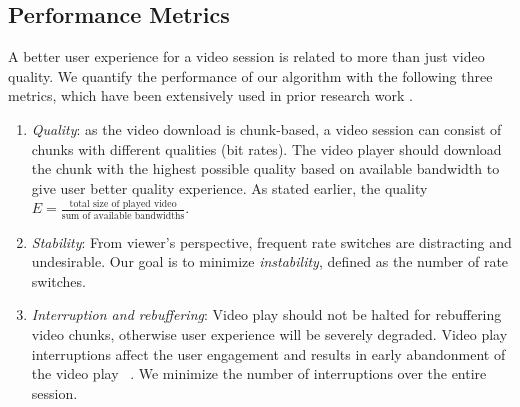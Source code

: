 \subsection{Performance Metrics}\label{subsec:metrics}

A better user experience for a video session is related to more than just video quality. 
We quantify the performance of our algorithm with the following three
metrics, which have been extensively used in prior research work
\cite{Qava, Avis,VideoMeasurement, Festive}. 


\begin{enumerate}
\item\textit{Quality}: as the video download is chunk-based, a video
  session can consist of chunks with different qualities (bit
  rates). The video player should download the chunk with the highest
  possible quality based on available bandwidth
  to give user better quality experience. As stated earlier, the quality
  $E = \frac{\mbox{total size of played video}}{\mbox{sum of available bandwidths}}$.

\item\textit{Stability}: From viewer's perspective, frequent rate
  switches are distracting and undesirable. Our goal is to minimize 
  \emph{instability}, defined as the number of rate switches.
  
\item\textit{Interruption and rebuffering}: Video play should not be
  halted for rebuffering video chunks, otherwise user experience will
  be severely degraded. Video play interruptions affect the user
  engagement and results in early abandonment of the video play
  ~\cite{VideoMeasurement}. We minimize the 
  number of interruptions over the entire session. %
\end{enumerate}

